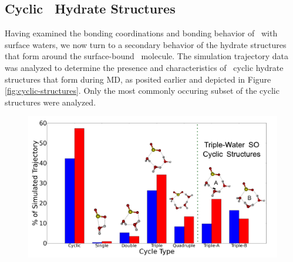 \subsection{Cyclic \suldiox~Hydrate Structures}

Having examined the bonding coordinations and bonding behavior of \suldiox~with surface waters, we now turn to a secondary behavior of the hydrate structures that form around the surface-bound \suldiox~molecule. The simulation trajectory data was analyzed to determine the presence and characteristics of \suldiox~cyclic hydrate structures that form during MD, as posited earlier and depicted in Figure \ref{fig:cyclic-structures}. Only the most commonly occuring subset of the cyclic structures were analyzed. 

\begin{figure}[h!]
	\begin{center}
		\includegraphics[scale=1.0]{images/cycles/SO-cycle-breakdown-with-cartoons-small.png}
		\caption{}
		\label{fig:cyclic-breakdown}
	\end{center}
\end{figure}
